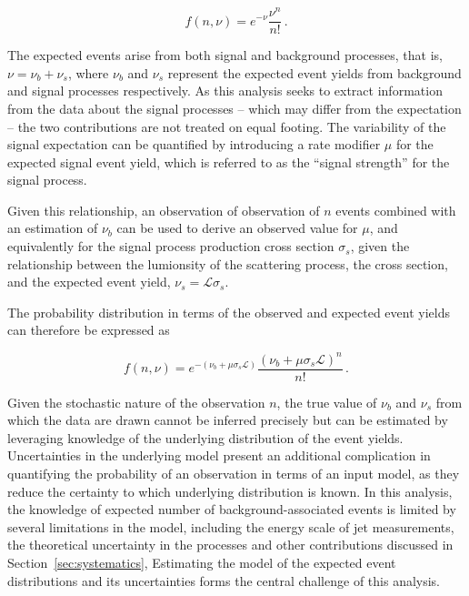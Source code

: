 \begin{equation}
  f(n, \nu) = e^{-\nu}\frac{\nu^{n}}{n!} \,.
\end{equation}

The expected events arise from both signal and background
processes, that is, $\nu = \nu_{b} + \nu_{s}$, where $\nu_{b}$ and $\nu_s$
represent the expected event yields from background and signal processes
respectively. As this analysis seeks to extract information from the data about the signal
processes -- which may differ from the expectation --
the two contributions are not treated on equal footing. 
The variability of the signal expectation can be quantified by 
introducing a rate modifier $\mu$ for the expected signal event yield, which
is referred to as the ``signal strength'' for the signal process.

Given this relationship, an observation of observation of $n$ events
combined with an estimation of $\nu_{b}$ can be used to derive an
observed value for $\mu$, and equivalently for the signal process
production cross section $\sigma_{s}$, given the relationship 
between the lumionsity of the scattering process, the cross section,
and the expected event yield, $\nu_s = \mathcal{L}\sigma_{s}$.

The probability distribution in terms of the 
observed and expected event yields can therefore be expressed as

\begin{equation}
  f(n, \nu) = e^{-(\nu_{b} + \mu\sigma_{s}\mathcal{L})}\frac{(\nu_{b} + \mu\sigma_{s}\mathcal{L})^{n}}{n!} \,.
\end{equation}

Given the stochastic nature of the observation $n$, the 
true value of $\nu_b$ and $\nu_s$ from which the data are drawn cannot be inferred precisely
but can be estimated by
leveraging knowledge of the underlying distribution of the event yields.
Uncertainties in the underlying model present an additional complication
in quantifying the probability of an observation in terms of an input model,
as they reduce the certainty to which underlying distribution is known.
In this analysis, the knowledge of expected number of background-associated events
is limited by several limitations in the model, including the energy
scale of jet measurements, the theoretical uncertainty in the \WZ processes
and other contributions discussed in Section~\ref{sec:systematics},
Estimating the model of the expected event distributions and its uncertainties 
forms the central challenge of this analysis.

